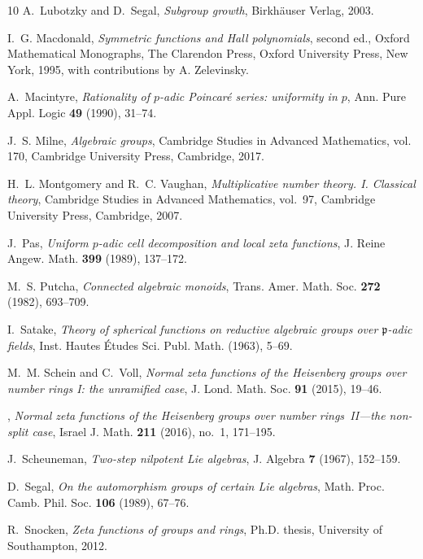 \documentclass[11pt,a4paper]{amsart}
\theoremstyle{plain}
\theoremstyle{remark}
\begin{document}
\begin{thebibliography}{10}
A.~Lubotzky and D.~Segal, \emph{Subgroup growth}, Birkh\"{a}user Verlag, 2003.

I.~G. Macdonald, \emph{Symmetric functions and {H}all polynomials}, second ed.,
  Oxford Mathematical Monographs, The Clarendon Press, Oxford University Press,
  New York, 1995, with contributions by A. Zelevinsky.

A.~Macintyre, \emph{Rationality of {$p$}-adic {P}oincar\'{e} series: uniformity
  in {$p$}}, Ann. Pure Appl. Logic \textbf{49} (1990), 31--74.

J.~S. Milne, \emph{Algebraic groups}, Cambridge Studies in Advanced
  Mathematics, vol. 170, Cambridge University Press, Cambridge, 2017.

H.~L. Montgomery and R.~C. Vaughan, \emph{Multiplicative number theory. {I}.
  {C}lassical theory}, Cambridge Studies in Advanced Mathematics, vol.~97,
  Cambridge University Press, Cambridge, 2007.

J.~Pas, \emph{Uniform {$p$}-adic cell decomposition and local zeta functions},
  J. Reine Angew. Math. \textbf{399} (1989), 137--172.

M.~S. Putcha, \emph{Connected algebraic monoids}, Trans. Amer. Math. Soc.
  \textbf{272} (1982), 693--709.

I.~Satake, \emph{Theory of spherical functions on reductive algebraic groups
  over {${\mathfrak p}$}-adic fields}, Inst. Hautes \'Etudes Sci. Publ. Math.
  (1963), 5--69.

M.~M. Schein and C.~Voll, \emph{Normal zeta functions of the {H}eisenberg
  groups over number rings {I}: the unramified case}, J. Lond. Math. Soc.
  \textbf{91} (2015), 19--46.

\bysame, \emph{Normal zeta functions of the {H}eisenberg groups over number
  rings~{II}---the non-split case}, Israel J. Math. \textbf{211} (2016), no.~1,
  171--195.

J.~Scheuneman, \emph{Two-step nilpotent {L}ie algebras}, J. Algebra \textbf{7}
  (1967), 152--159.

D.~Segal, \emph{On the automorphism groups of certain {L}ie algebras}, Math.
  Proc. Camb. Phil. Soc. \textbf{106} (1989), 67--76.

R.~Snocken, \emph{{Zeta functions of groups and rings}}, Ph.D. thesis,
  University of Southampton, 2012.


\end{thebibliography}
\end{document}
